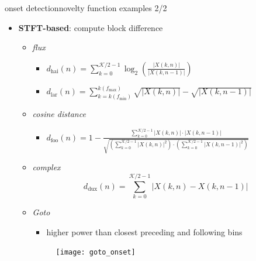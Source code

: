         \begin{frame}{onset detection}{novelty function examples 2/2}
            \begin{itemize}
                \item	\textbf{STFT-based}: compute block difference 
                    \begin{itemize}
                        \item	\textit{flux}
                        {
                            \begin{itemize}
                                \item $d_\mathrm{hai}(n) = \sum\limits_{k = 0}^{\mathcal{K}/2-1}{\log_2\left(\frac{|X(k,n)|}{|X(k,n-1)|}\right)}$
                                \item $d_\mathrm{lar}(n) = \sum\limits_{k = k(f_{\mathrm{min}})}^{k(f_{\mathrm{max}})}{\sqrt{|X(k,n)|}-\sqrt{|X(k,n-1)|}}$
                            \end{itemize}
                        }
                        \item<2->	\textit{cosine distance}
                        {
                            \begin{itemize}
                                \item $d_\mathrm{foo}(n)	= 1 - \frac{\sum\limits_{k = 0}^{\mathcal{K}/2-1}{|X(k,n)|\cdot |X(k,n-1)|}}{\sqrt{\left(\sum\limits_{k=0}^{\mathcal{K}/2-1}{|X(k,n)|^2}\right)\cdot \left(\sum\limits_{k=0}^{\mathcal{K}/2-1}{|X(k,n-1)|^2}\right)}}$
                            \end{itemize}
                        }
                        \item<3->	\textit{complex}
                        {
                            \begin{equation*}
                                d_\mathrm{dux}(n) = \sum\limits_{k = 0}^{\mathcal{K}/2-1}{|X(k,n)-X(k,n-1)|}
                            \end{equation*}
                        }
                        \item<4->	\textit{Goto}
                            \begin{itemize}
                                \item	higher power than closest preceding and following bins
                            \end{itemize}
                        {							
                            \begin{figure}
                                \centering
                                \texttt{[image: goto\_onset]}
                            \end{figure}
                        }
                    \end{itemize}
            \end{itemize}
        \end{frame}
